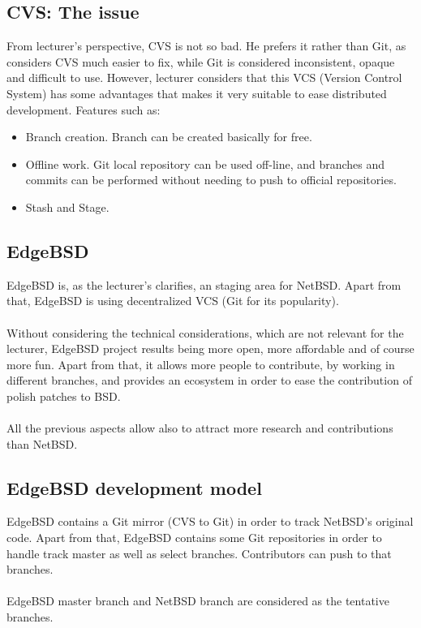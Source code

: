 \documentclass[11pt]{article}
\begin{document}
\subsection{CVS: The issue}
From lecturer's perspective, CVS is not so bad. He prefers it rather than Git, as considers CVS much easier to fix, while Git is considered inconsistent, opaque and difficult to use. However, lecturer considers that this VCS (Version Control System) has some advantages that makes it very suitable to ease distributed development. Features such as:
\begin{itemize}
\item{Branch creation}. Branch can be created basically for free. 
\item{Offline work}. Git local repository can be used off-line, and branches and commits can be performed without needing to push to official repositories.
\item{Stash and Stage}.
\end{itemize}

\subsection{EdgeBSD}
EdgeBSD is, as the lecturer's clarifies, an staging area for NetBSD. Apart from that, EdgeBSD is using decentralized VCS (Git for its popularity).\\
\\
Without considering the technical considerations, which are not relevant for the lecturer, EdgeBSD project results being more open, more affordable and of course more fun. Apart from that, it allows more people to contribute, by working in different branches, and provides an ecosystem in order to ease the contribution of polish patches to BSD.\\
\\
All the previous aspects allow also to attract more research and contributions than NetBSD.

\subsection{EdgeBSD development model}
EdgeBSD contains a Git mirror (CVS to Git) in order to track NetBSD's original code. Apart from that, EdgeBSD contains some Git repositories in order to handle track master as well as select branches. Contributors can push to that branches.\\
\\
EdgeBSD master branch and NetBSD branch are considered as the tentative branches. 
\end{document}
